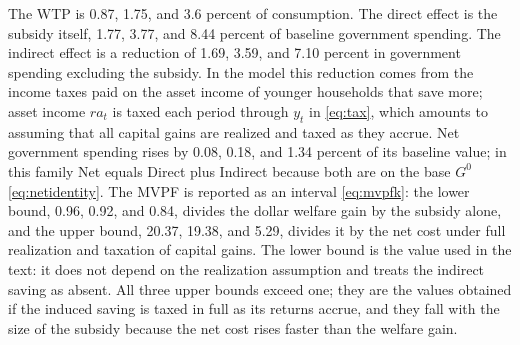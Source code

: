 The WTP is 0.87, 1.75, and 3.6 percent of consumption. %
The direct effect is the subsidy itself, 1.77, 3.77, and 8.44 percent of baseline government spending. %
The indirect effect is a reduction of 1.69, 3.59, and 7.10 percent in government spending excluding the subsidy. %
In the model this reduction comes from the income taxes paid on the asset income of younger households that save more; asset income $r a_t$ is taxed each period through $y_t$ in \eqref{eq:tax}, which amounts to assuming that all capital gains are realized and taxed as they accrue. %
Net government spending rises by 0.08, 0.18, and 1.34 percent of its baseline value; in this family Net equals Direct plus Indirect because both are on the base $G^{0}$ \eqref{eq:netidentity}. %
The MVPF is reported as an interval \eqref{eq:mvpfk}: the lower bound, 0.96, 0.92, and 0.84, divides the dollar welfare gain by the subsidy alone, and the upper bound, 20.37, 19.38, and 5.29, divides it by the net cost under full realization and taxation of capital gains. %
The lower bound is the value used in the text: it does not depend on the realization assumption and treats the indirect saving as absent. All three upper bounds exceed one; they are the values obtained if the induced saving is taxed in full as its returns accrue, and they fall with the size of the subsidy because the net cost rises faster than the welfare gain. %

